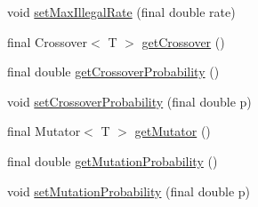 \begin{CompactItemize}
\item 
void \hyperlink{classjenes_1_1algorithms_1_1_simple_g_a_3_01_t_01extends_01_chromosome_01_4_4051bc6ee99fe2450c9dbad64c7ab594}{setMaxIllegalRate} (final double rate)
\item 
final Crossover$<$ T $>$ \hyperlink{classjenes_1_1algorithms_1_1_simple_g_a_3_01_t_01extends_01_chromosome_01_4_3411f8691495bdd8e3818f8ee6fcc181}{getCrossover} ()
\item 
final double \hyperlink{classjenes_1_1algorithms_1_1_simple_g_a_3_01_t_01extends_01_chromosome_01_4_85ed250d10211b0faf798bef2663ec9f}{getCrossoverProbability} ()
\item 
void \hyperlink{classjenes_1_1algorithms_1_1_simple_g_a_3_01_t_01extends_01_chromosome_01_4_639f43de8d71ae3e28077c4510eae64e}{setCrossoverProbability} (final double p)
\item 
final Mutator$<$ T $>$ \hyperlink{classjenes_1_1algorithms_1_1_simple_g_a_3_01_t_01extends_01_chromosome_01_4_f1b77602d4f2440c2abde1f8a9d336e7}{getMutator} ()
\item 
final double \hyperlink{classjenes_1_1algorithms_1_1_simple_g_a_3_01_t_01extends_01_chromosome_01_4_0f8be347c9405a5b82d7a10678fc9a3a}{getMutationProbability} ()
\item 
void \hyperlink{classjenes_1_1algorithms_1_1_simple_g_a_3_01_t_01extends_01_chromosome_01_4_2ce1369d995dc328caa6b542e24e55f6}{setMutationProbability} (final double p)
\end{CompactItemize}
